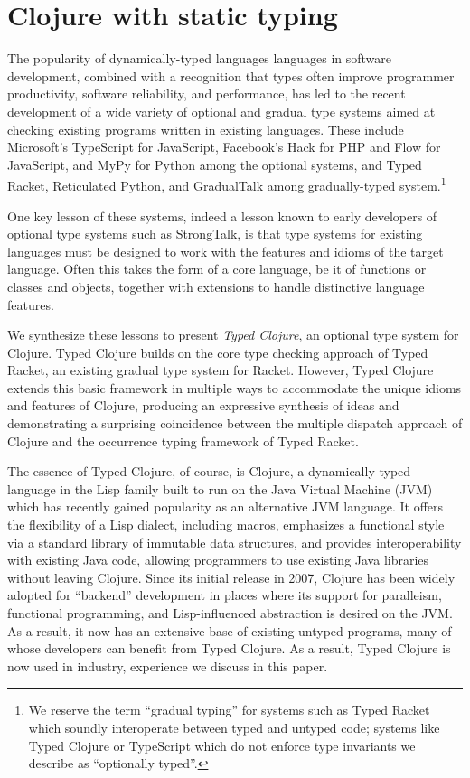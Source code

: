 \section{Clojure with static typing}


The popularity of dynamically-typed languages languages in software
development, combined with a recognition that types often improve
programmer productivity, software reliability, and performance, has
led to the recent development of a wide variety of optional and
gradual type systems aimed at checking existing programs written in
existing languages.  These include Microsoft's TypeScript for
JavaScript, Facebook's Hack for PHP and Flow for JavaScript, and MyPy
for Python among the optional systems, and Typed Racket, Reticulated
Python, and GradualTalk among gradually-typed system.\footnote{We
  reserve the term ``gradual typing'' for systems such as Typed Racket which soundly
  interoperate between typed and untyped code; systems like Typed Clojure or TypeScript which do not
  enforce type invariants we describe as ``optionally typed''.}

One key lesson of these systems, indeed a lesson known to early
developers of optional type systems such as StrongTalk, is that type
systems for existing languages must be designed to work with the
features and idioms of the target language. Often this takes the form
of a core language, be it of functions or classes and objects,
together with extensions to handle distinctive language features.


We synthesize these lessons to present \emph{Typed Clojure}, an
optional type system for Clojure. Typed Clojure builds on the core
type checking approach of Typed Racket, an existing gradual type
system for Racket. However, Typed Clojure extends this basic framework
in multiple ways to accommodate the unique idioms and features of
Clojure, producing an expressive synthesis of ideas and demonstrating
a surprising coincidence between the multiple dispatch approach of
Clojure and the occurrence typing framework of Typed Racket. 

The essence of Typed Clojure, of course, is Clojure, a dynamically
typed language in the Lisp family built to run on the Java Virtual
Machine (JVM) which has recently gained popularity as an alternative
JVM language.  It offers the flexibility of a Lisp dialect, including
macros, emphasizes a functional style via a
standard library of immutable data structures, and provides
interoperability with existing Java code, allowing programmers to use
existing Java libraries without leaving Clojure.
%
Since its initial release in 2007, Clojure has been widely adopted for
``backend'' development in places where its support for paralleism,
functional programming, and Lisp-influenced abstraction is desired on
the JVM. As a result, it now has an extensive base of existing untyped
programs, many of whose developers can benefit from Typed Clojure. As
a result, Typed Clojure is now used in industry, experience we discuss
in this paper.

